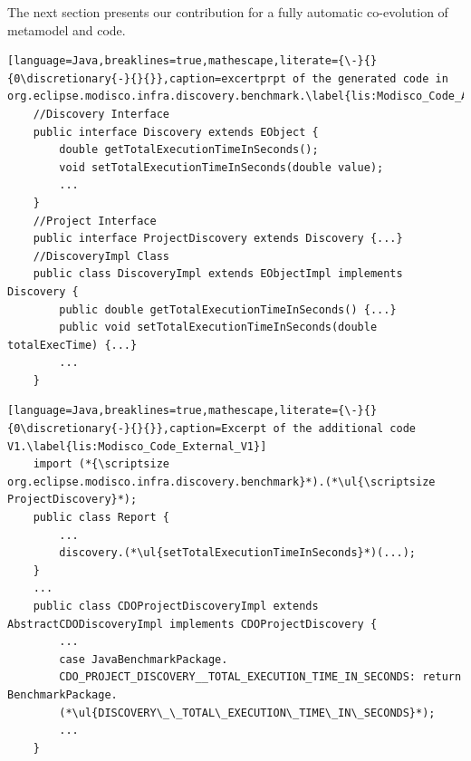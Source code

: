 The next section presents our contribution for a fully automatic co-evolution of metamodel and code.  

\begin{lstlisting}[language=Java,breaklines=true,mathescape,literate={\-}{}{0\discretionary{-}{}{}},caption=excertprpt of the generated code in org.eclipse.modisco.infra.discovery.benchmark.\label{lis:Modisco_Code_API_V1}]
	//Discovery Interface
	public interface Discovery extends EObject {
		double getTotalExecutionTimeInSeconds();
		void setTotalExecutionTimeInSeconds(double value);
		...
	}
	//Project Interface
	public interface ProjectDiscovery extends Discovery {...}
	//DiscoveryImpl Class
	public class DiscoveryImpl extends EObjectImpl implements Discovery {
		public double getTotalExecutionTimeInSeconds() {...}
		public void setTotalExecutionTimeInSeconds(double totalExecTime) {...}
		...
	}
\end{lstlisting}
\begin{lstlisting}[language=Java,breaklines=true,mathescape,literate={\-}{}{0\discretionary{-}{}{}},caption=Excerpt of the additional code V1.\label{lis:Modisco_Code_External_V1}]
	import (*{\scriptsize org.eclipse.modisco.infra.discovery.benchmark}*).(*\ul{\scriptsize ProjectDiscovery}*);
	public class Report {
		...
		discovery.(*\ul{setTotalExecutionTimeInSeconds}*)(...);
	}
	...
	public class CDOProjectDiscoveryImpl extends AbstractCDODiscoveryImpl implements CDOProjectDiscovery {
		...
		case JavaBenchmarkPackage.
		CDO_PROJECT_DISCOVERY__TOTAL_EXECUTION_TIME_IN_SECONDS: return BenchmarkPackage.
		(*\ul{DISCOVERY\_\_TOTAL\_EXECUTION\_TIME\_IN\_SECONDS}*);
		...
	}
	
	
\end{lstlisting}

